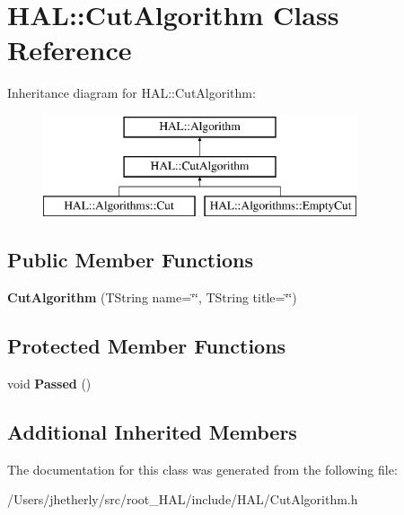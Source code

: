 \hypertarget{class_h_a_l_1_1_cut_algorithm}{\section{H\+A\+L\+:\+:Cut\+Algorithm Class Reference}
\label{class_h_a_l_1_1_cut_algorithm}
}
Inheritance diagram for H\+A\+L\+:\+:Cut\+Algorithm\+:\begin{figure}[H]
\begin{center}
\leavevmode
\includegraphics[height=3.000000cm]{class_h_a_l_1_1_cut_algorithm}
\end{center}
\end{figure}
\subsection*{Public Member Functions}
\begin{DoxyCompactItemize}
\item 
\hypertarget{class_h_a_l_1_1_cut_algorithm_a7009161a2b8463fddb9d6336cb2ef669}{{\bfseries Cut\+Algorithm} (T\+String name=\char`\"{}\char`\"{}, T\+String title=\char`\"{}\char`\"{})}\label{class_h_a_l_1_1_cut_algorithm_a7009161a2b8463fddb9d6336cb2ef669}

\end{DoxyCompactItemize}
\subsection*{Protected Member Functions}
\begin{DoxyCompactItemize}
\item 
\hypertarget{class_h_a_l_1_1_cut_algorithm_ad41a2ea5664562c3331f85bcc85317be}{void {\bfseries Passed} ()}\label{class_h_a_l_1_1_cut_algorithm_ad41a2ea5664562c3331f85bcc85317be}

\end{DoxyCompactItemize}
\subsection*{Additional Inherited Members}


The documentation for this class was generated from the following file\+:\begin{DoxyCompactItemize}
\item 
/\+Users/jhetherly/src/root\+\_\+\+H\+A\+L/include/\+H\+A\+L/Cut\+Algorithm.\+h\end{DoxyCompactItemize}
